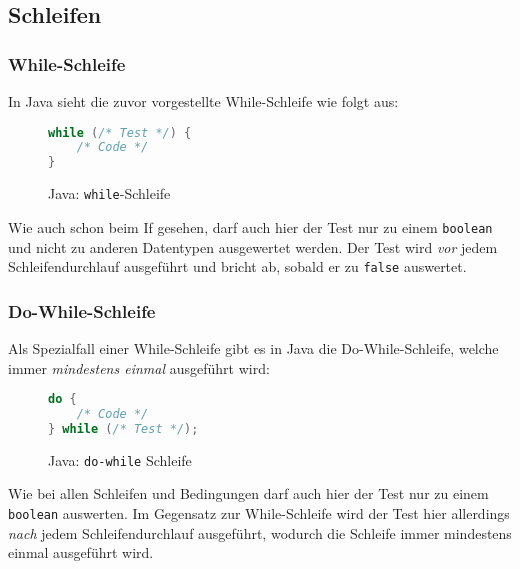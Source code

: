 \subsection{Schleifen}
	
	\subsubsection{While-Schleife}
		In Java sieht die zuvor vorgestellte While-Schleife wie folgt aus:
		\begin{figure}[H]
			\centering
			\begin{lstlisting}[language = Java]
while (/* Test */) {
	/* Code */
}
			\end{lstlisting}
			\caption{Java: \texttt{while}-Schleife}
		\end{figure}
		
		Wie auch schon beim If gesehen, darf auch hier der Test nur zu einem \texttt{boolean} und nicht zu anderen Datentypen ausgewertet werden. Der Test wird \textit{vor} jedem Schleifendurchlauf ausgeführt und bricht ab, sobald er zu \texttt{false} auswertet.
	
	\subsubsection{Do-While-Schleife}
		Als Spezialfall einer While-Schleife gibt es in Java die Do-While-Schleife, welche immer \textit{mindestens einmal} ausgeführt wird:
		\begin{figure}[H]
			\centering
			\begin{lstlisting}[language = Java]
do {
	/* Code */
} while (/* Test */);
			\end{lstlisting}
			\caption{Java: \texttt{do-while} Schleife}
		\end{figure}
		
		Wie bei allen Schleifen und Bedingungen darf auch hier der Test nur zu einem \texttt{boolean} auswerten. Im Gegensatz zur While-Schleife wird der Test hier allerdings \textit{nach} jedem Schleifendurchlauf ausgeführt, wodurch die Schleife immer mindestens einmal ausgeführt wird.
	
